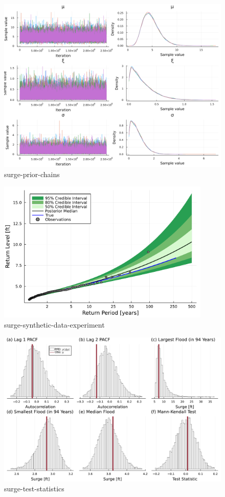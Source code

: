 \documentclass[12pt]{article}
\begin{document}
\begin{figure}
    \centering
    \includegraphics[width=\textwidth]{surge-prior-chains}
    \caption{surge-prior-chains}\label{fig:surge-prior-chains}
\end{figure}

\begin{figure}
    \centering
    \includegraphics[width=4in]{surge-synthetic-data-experiment}
    \caption{surge-synthetic-data-experiment}\label{fig:surge-synthetic-data-experiment}
\end{figure}

\begin{figure}
    \centering
    \includegraphics[width=\textwidth]{surge-test-statistics}
    \caption{surge-test-statistics}\label{fig:surge-test-statistics}
\end{figure}
\end{document}
